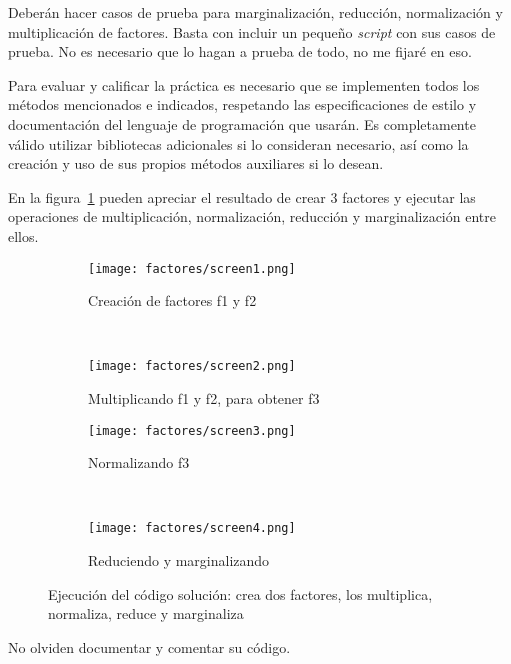Deberán hacer casos de prueba para marginalización, reducción, normalización y multiplicación de factores. Basta con incluir un pequeño \textit{script} con sus casos de prueba. No es necesario que lo hagan a prueba de todo, no me fijaré en eso.

Para evaluar y calificar la práctica es necesario que se implementen todos los métodos mencionados e indicados, respetando las especificaciones de estilo y documentación del lenguaje de programación que usarán.
Es completamente válido utilizar bibliotecas adicionales si lo consideran necesario, así como la creación y uso de sus propios métodos auxiliares si lo desean.

En la figura~\ref{fig:P5solution} pueden apreciar el resultado de crear 3 factores y ejecutar las operaciones de multiplicación, normalización, reducción y marginalización entre ellos. 

\begin{figure}[H]
  \centering
  \begin{subfigure}[b]{.45\textwidth}
    \texttt{[image: factores/screen1.png]}
    \caption{Creación de factores f1 y f2}
  \end{subfigure}
  ~
  \begin{subfigure}[b]{.45\textwidth}
    \texttt{[image: factores/screen2.png]}
    \caption{Multiplicando f1 y f2, para obtener f3}
  \end{subfigure}


  \begin{subfigure}[b]{.45\textwidth}
    \texttt{[image: factores/screen3.png]}
    \caption{Normalizando f3}
  \end{subfigure}
  ~
  \begin{subfigure}[b]{.45\textwidth}
    \texttt{[image: factores/screen4.png]}
    \caption{Reduciendo y marginalizando}
  \end{subfigure}
  \caption{Ejecución del código solución: crea dos factores, los multiplica, normaliza, reduce y marginaliza}
  \label{fig:P5solution}
\end{figure}

No olviden documentar y comentar su código.
